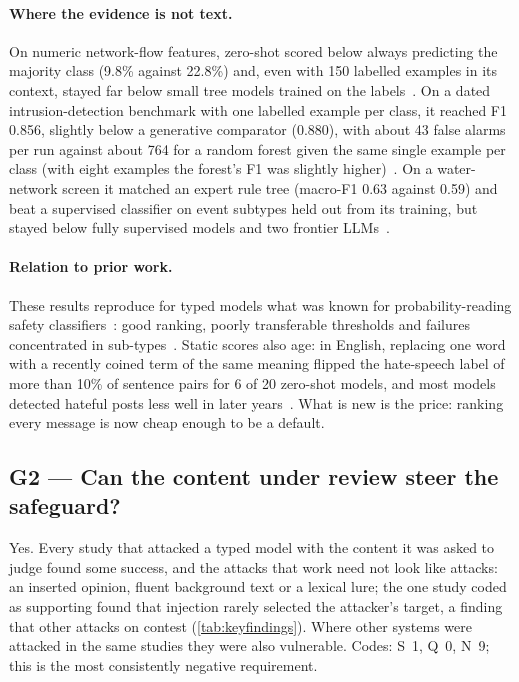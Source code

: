 \paragraph{Where the evidence is not text.}
On numeric network-flow features, zero-shot \jev{} scored below always predicting the majority class (9.8\% against 22.8\%) and, even with 150 labelled examples in its context, stayed far below small tree models trained on the labels~\cite{arx00376}.
On a dated intrusion-detection benchmark with one labelled example per class, it reached F1 0.856, slightly below a generative comparator (0.880), with about 43 false alarms per run against about 764 for a random forest given the same single example per class (with eight examples the forest's F1 was slightly higher)~\cite{arx01079}.
On a water-network screen it matched an expert rule tree (macro-F1 0.63 against 0.59) and beat a supervised classifier on event subtypes held out from its training, but stayed below fully supervised models and two frontier LLMs~\cite{arx02048}.

\paragraph{Relation to prior work.}
These results reproduce for typed models what was known for probability-reading safety classifiers~\cite{inan2023llama,markov2023holistic}: good ranking, poorly transferable thresholds and failures concentrated in sub-types~\cite{rottger2021hatecheck}.
Static scores also age: in English, replacing one word with a recently coined term of the same meaning flipped the hate-speech label of more than 10\% of sentence pairs for 6 of 20 zero-shot models, and most models detected hateful posts less well in later years~\cite{dibonaventura2025hatevolution}.
What is new is the price: ranking every message is now cheap enough to be a default.

\subsection{G2 --- Can the content under review steer the safeguard?}
\label{sec:g2}

\begin{answerbox}
Yes.
Every study that attacked a typed model with the content it was asked to judge found some success, and the attacks that work need not look like attacks: an inserted opinion, fluent background text or a lexical lure; the one study coded as supporting found that injection rarely selected the attacker's target, a finding that other attacks on \jev{} contest (\cref{tab:keyfindings}).
Where other systems were attacked in the same studies they were also vulnerable.
Codes: S~1, Q~0, N~9; this is the most consistently negative requirement.
\end{answerbox}


